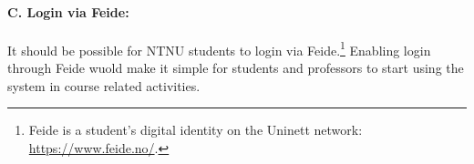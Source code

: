 \paragraph*{C. Login via Feide:} It should be possible for NTNU students to login via Feide.\footnote{Feide is a student's digital identity on the Uninett network: \url{https://www.feide.no/}.} Enabling login through Feide wuold make it simple for students and professors to start using the system in course related activities.
